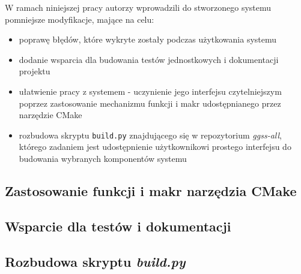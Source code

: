 
W ramach niniejszej pracy autorzy wprowadzili do stworzonego systemu pomniejsze modyfikacje, mające na celu:
\begin{itemize}
    \item poprawę błędów, które wykryte zostały podczas użytkowania systemu 
    \item dodanie wsparcia dla budowania testów jednostkowych i dokumentacji projektu
    \item ułatwienie pracy z systemem - uczynienie jego interfejsu czytelniejszym poprzez zastosowanie mechanizmu funkcji i makr udostępnianego przez narzędzie CMake
    \item rozbudowa skryptu \lstinline{build.py} znajdującego się w repozytorium \emph{ggss-all}, którego zadaniem jest udostępnienie użytkownikowi prostego interfejsu do budowania wybranych komponentów systemu
\end{itemize}










\subsection{Zastosowanie funkcji i makr narzędzia CMake}

\subsection{Wsparcie dla testów i dokumentacji}

\subsection{Rozbudowa skryptu \emph{build.py}}

